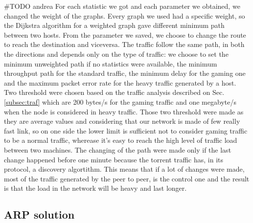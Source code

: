 \documentclass[conference,10pt]{IEEEtran}
\begin{document}
  \#TODO andrea
	For each statistic we got and each parameter we obtained, we changed the weight of the graphs. Every graph we used had a specific weight, so the
	Dijkstra algorithm for a weighted graph gave different minimum path between two hosts. From the parameter we saved, we choose to change the
	route to reach the destination and viceversa. The traffic follow the same path, in both the directions and depends only on the type of traffic:
	we choose to set the minimum unweighted path if no statistics were available, the minimum throughput path for the standard traffic, the minimum
	delay for the gaming one and the maximum packet error rate for the heavy traffic generated by a host.
	Two threshold were chosen based on the traffic analysis described on Sec. \ref{subsec:traf} which are 200 bytes/s for the gaming traffic and one megabyte/s
	when the node is considered in heavy traffic. Those two threshold were made as they are average values and considering that our network is made of few really fast link,
	so on one side the lower limit is sufficient not to consider gaming traffic to be a normal traffic, wherease it's easy to reach the high level of traffic load between two machines.
	The changing of the path were made only if the last change happened before one minute because the torrent traffic has, in its protocol, a discovery
	algortithm. This means that if a lot of changes were made, most of the traffic generated by the peer to peer, is the control one and the result is that the
	load in the network will be heavy and last longer.

  \subsection{ARP solution} %
\end{document}
